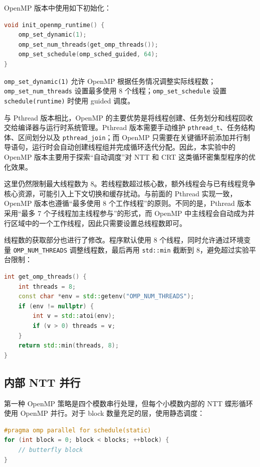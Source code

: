 \documentclass[a4paper]{article}
\begin{document}
OpenMP 版本中使用如下初始化：

\begin{lstlisting}[title=OpenMP 初始化,frame=trbl,language={C++}]
void init_openmp_runtime() {
    omp_set_dynamic(1);
    omp_set_num_threads(get_omp_threads());
    omp_set_schedule(omp_sched_guided, 64);
}
\end{lstlisting}

\texttt{omp\_set\_dynamic(1)} 允许 OpenMP 根据任务情况调整实际线程数；\texttt{omp\_set\_num\_threads} 设置最多使用 8 个线程；\texttt{omp\_set\_schedule} 设置 \texttt{schedule(runtime)} 时使用 guided 调度。

与 Pthread 版本相比，OpenMP 的主要优势是将线程创建、任务划分和线程回收交给编译器与运行时系统管理。Pthread 版本需要手动维护 \texttt{pthread\_t}、任务结构体、区间划分以及 \texttt{pthread\_join}；而 OpenMP 只需要在关键循环前添加并行制导语句，运行时会自动创建线程组并完成循环迭代分配。因此，本实验中的 OpenMP 版本主要用于探索“自动调度”对 NTT 和 CRT 这类循环密集型程序的优化效果。

这里仍然限制最大线程数为 8。若线程数超过核心数，额外线程会与已有线程竞争核心资源，可能引入上下文切换和缓存扰动。与前面的 Pthread 实现一致，OpenMP 版本也遵循“最多使用 8 个工作线程”的原则。不同的是，Pthread 版本采用“最多 7 个子线程加主线程参与”的形式，而 OpenMP 中主线程会自动成为并行区域中的一个工作线程，因此只需要设置总线程数即可。

线程数的获取部分也进行了修改。程序默认使用 8 个线程，同时允许通过环境变量 \texttt{OMP\_NUM\_THREADS} 调整线程数，最后再用 \texttt{std::min} 截断到 8，避免超过实验平台限制：

\begin{lstlisting}[title=OpenMP 线程数限制,frame=trbl,language={C++}]
int get_omp_threads() {
    int threads = 8;
    const char *env = std::getenv("OMP_NUM_THREADS");
    if (env != nullptr) {
        int v = std::atoi(env);
        if (v > 0) threads = v;
    }
    return std::min(threads, 8);
}
\end{lstlisting}

\subsection{内部 NTT 并行}

第一种 OpenMP 策略是四个模数串行处理，但每个小模数内部的 NTT 蝶形循环使用 OpenMP 并行。对于 block 数量充足的层，使用静态调度：

\begin{lstlisting}[title=NTT block 静态调度,frame=trbl,language={C++}]
#pragma omp parallel for schedule(static)
for (int block = 0; block < blocks; ++block) {
    // butterfly block
}
\end{lstlisting}
\end{document}
